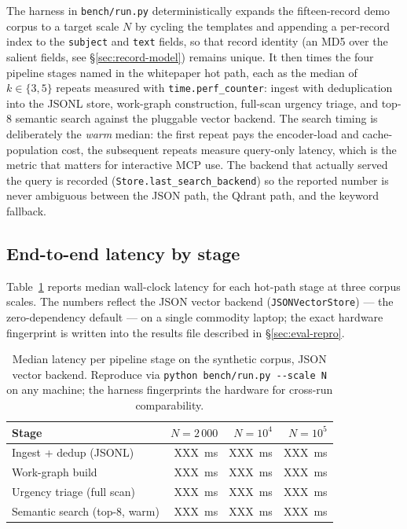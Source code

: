 The harness in \texttt{bench/run.py} deterministically expands the fifteen-record
demo corpus to a target scale $N$ by cycling the templates and appending a
per-record index to the \texttt{subject} and \texttt{text} fields, so that record
identity (an MD5 over the salient fields, see \S\ref{sec:record-model}) remains
unique. It then times the four pipeline stages named in the whitepaper hot path,
each as the median of $k \in \{3,5\}$ repeats measured with
\texttt{time.perf\_counter}: ingest with deduplication into the JSONL store,
work-graph construction, full-scan urgency triage, and top-$8$ semantic search
against the pluggable vector backend. The search timing is deliberately the
\emph{warm} median: the first repeat pays the encoder-load and cache-population
cost, the subsequent repeats measure query-only latency, which is the metric
that matters for interactive MCP use. The backend that actually served the
query is recorded (\texttt{Store.last\_search\_backend}) so the reported number
is never ambiguous between the JSON path, the Qdrant path, and the keyword
fallback.

\subsection{End-to-end latency by stage}
\label{sec:eval-latency}

Table~\ref{tab:latency} reports median wall-clock latency for each hot-path
stage at three corpus scales. The numbers reflect the JSON vector backend
(\texttt{JSONVectorStore}) — the zero-dependency default — on a single
commodity laptop; the exact hardware fingerprint is written into the results
file described in \S\ref{sec:eval-repro}.

\begin{table}[h]
\centering
\small
\begin{tabular}{lrrr}
\toprule
\textbf{Stage} & \textbf{$N{=}2\,000$} & \textbf{$N{=}10^{4}$} & \textbf{$N{=}10^{5}$} \\
\midrule
Ingest + dedup (JSONL) & \SI{XXX}{\milli\second} & \SI{XXX}{\milli\second} & \SI{XXX}{\milli\second} \\
Work-graph build       & \SI{XXX}{\milli\second} & \SI{XXX}{\milli\second} & \SI{XXX}{\milli\second} \\
Urgency triage (full scan) & \SI{XXX}{\milli\second} & \SI{XXX}{\milli\second} & \SI{XXX}{\milli\second} \\
Semantic search (top-8, warm) & \SI{XXX}{\milli\second} & \SI{XXX}{\milli\second} & \SI{XXX}{\milli\second} \\
\bottomrule
\end{tabular}
\caption{Median latency per pipeline stage on the synthetic corpus, JSON
vector backend. Reproduce via \texttt{python bench/run.py -{}-scale N} on any
machine; the harness fingerprints the hardware for cross-run comparability.}
\label{tab:latency}
\end{table}

